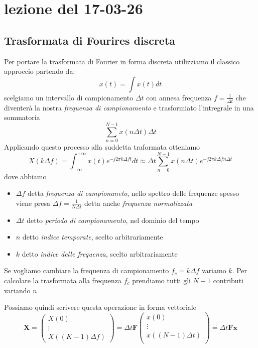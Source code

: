 \section{lezione del 17-03-26}
\subsection{Trasformata di Fourires discreta}\label{sub:Trasformata di Fourires discreta} %
Per portare la trasformata di Fourier in forma discreta utilizziamo il classico approccio
partendo da:
\[
   x(t) = \int x(t)dt 
\]
scelgiamo un intervallo di campionamento $ \Delta t $ con annesa frequenza 
$f = \frac{1}{\Delta t}$ che diventerà la nostra \textit{frequenza di campionamento}
e trasformiato l'intregrale in una sommatoria
\[
    \sum_{n = 0}^{N-1}x(n\Delta t)\Delta t
\]
Applicando questo processo alla suddetta traformata otteniamo
\[
    X(k\Delta f) = \int_{- \infty}^{+\infty} x(t)e^{- j 2 \pi k \Delta f t} dt \approx \Delta t \sum_{n = 0}^{N - 1} x(n\Delta t)e^{- j 2 \pi k \Delta f n \Delta t}
\]
dove abbiamo 
\begin{itemize}
    \item $\Delta f$ detta \textit{frequenza di campionaneto}, nello spettro delle frequenze 
        spesso viene presa $\Delta f = \frac{1}{N \Delta t}$ detta anche \textit{frequenza normalizzata}
    \item $\Delta t$ detto \textit{periodo di campionamento}, nel dominio del tempo
    \item $n$ detto \textit{indice temporate}, scelto arbitrariamente
    \item $k$ detto \textit{indice delle frequenza}, scelto arbitrariamente
\end{itemize}

Se vogliamo cambiare la frequenza di campionamento $f_c = k\Delta f$ variamo $k$. 
Per calcolare la trasformata alla frequenza $f_c$ prendiamo tutti gli $N - 1$ contributi variando $n$ 

Possiamo quindi scrivere questa operazione in forma vettoriale
\[
\mathbf{X} =
\begin{pmatrix}
X\left( 0 \right) \\
\vdots \\
X\left( (K - 1) \Delta f \right)
\end{pmatrix} =
\Delta t \mathbf{F}
\begin{pmatrix}
x \left( 0 \right) \\
\vdots \\
x \left( (N - 1) \Delta t \right) \\
\end{pmatrix} =
\Delta t \mathbf{F} \mathbf{x}
\]

